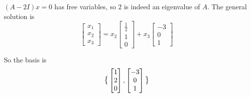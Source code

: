 \documentclass{article}
\begin{document}
 $ (A-2I)x=0 $ has free variables, so $ 2 $ is indeed an eigenvalue of $ A $. The general solution is
 \[
   \begin{bmatrix}
       x_1\\
       x_2\\
       x_3
   \end{bmatrix}=
   x_2\begin{bmatrix}
       \frac{1}{2} \\
       1\\
       0
   \end{bmatrix} +
   x_3\begin{bmatrix}
       -3\\
       0\\
       1
   \end{bmatrix}
 \]

 So the basis is
 \[
   \text{\large{\{}} \begin{bmatrix}
       1\\
       2\\
       0
   \end{bmatrix},
   \begin{bmatrix}
       -3\\
       0\\
       1
   \end{bmatrix}
 \text{\large{\}}}
 \]
 
 


 


  
\end{document}
